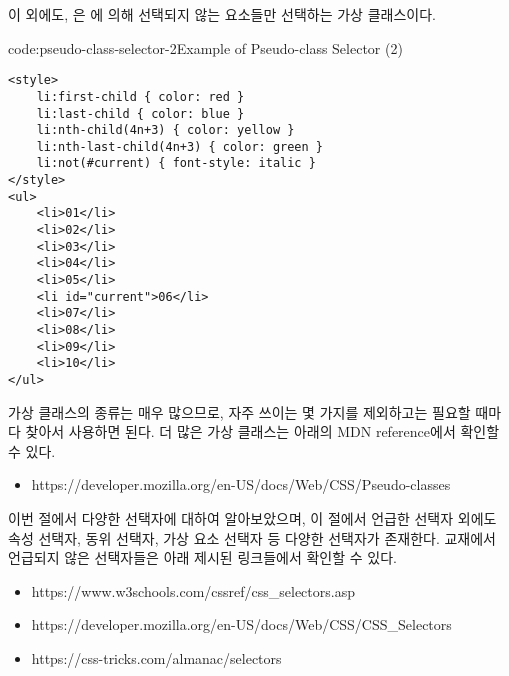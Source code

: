 이 외에도, 은 에 의해 선택되지 않는 요소들만 선택하는 가상 클래스이다.

\begin{codeenv}{code:pseudo-class-selector-2}{Example of Pseudo-class Selector (2)}\begin{verbatim}
<style>
    li:first-child { color: red }
    li:last-child { color: blue }
    li:nth-child(4n+3) { color: yellow }
    li:nth-last-child(4n+3) { color: green }
    li:not(#current) { font-style: italic }
</style>
<ul>
    <li>01</li>
    <li>02</li>
    <li>03</li>
    <li>04</li>
    <li>05</li>
    <li id="current">06</li>
    <li>07</li>
    <li>08</li>
    <li>09</li>
    <li>10</li>
</ul>
\end{verbatim}
\end{codeenv}

가상 클래스의 종류는 매우 많으므로, 자주 쓰이는 몇 가지를 제외하고는 필요할 때마다 찾아서 사용하면 된다. 더 많은 가상 클래스는 아래의 MDN reference에서 확인할 수 있다.

\begin{itemize}
    \item https://developer.mozilla.org/en-US/docs/Web/CSS/Pseudo-classes
\end{itemize}

이번 절에서 다양한 선택자에 대하여 알아보았으며, 이 절에서 언급한 선택자 외에도 속성 선택자, 동위 선택자, 가상 요소 선택자 등 다양한 선택자가 존재한다. 교재에서 언급되지 않은 선택자들은 아래 제시된 링크들에서 확인할 수 있다.

\begin{itemize}
    \item https://www.w3schools.com/cssref/css\_selectors.asp
    \item https://developer.mozilla.org/en-US/docs/Web/CSS/CSS\_Selectors
    \item https://css-tricks.com/almanac/selectors
\end{itemize}
